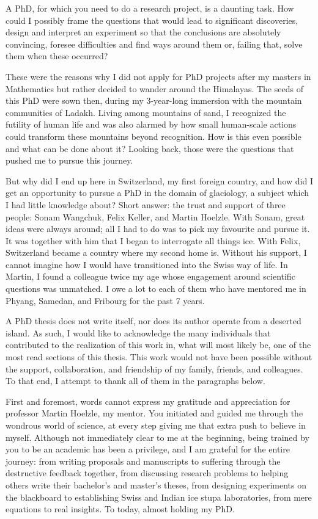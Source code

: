 \label{sec:acknowledgement}

A PhD, for which you need to do a research project, is a daunting task. How could I possibly frame the questions
that would lead to significant discoveries, design and interpret an experiment so that the conclusions are
absolutely convincing, foresee difficulties and find ways around them or, failing that, solve them when these
occurred?

These were the reasons why I did not apply for PhD projects after my masters in Mathematics but rather decided
to wander around the Himalayas. The seeds of this PhD were sown then, during my 3-year-long immersion with the
mountain communities of Ladakh. Living among mountains of sand, I recognized the futility of human life and was
also alarmed by how small human-scale actions could transform these mountains beyond recognition. How is this
even possible and what can be done about it? Looking back, those were the questions that pushed me to pursue
this journey. 

But why did I end up here in Switzerland, my first foreign country, and how did I get an opportunity to pursue a
PhD in the domain of glaciology, a subject which I had little knowledge about? Short answer: the trust and support
of three people: Sonam Wangchuk, Felix Keller, and Martin Hoelzle. With Sonam, great ideas were always 
around; all I had to do was to pick my favourite and pursue it. It was together with him that I began to interrogate
all things ice.  With Felix, Switzerland became a country where my second home is. Without his support, I cannot
imagine how I would have transitioned into the Swiss way of life. In Martin, I found a colleague twice my age
whose engagement around scientific questions was unmatched. I owe a lot to each of them who have mentored me
in Phyang, Samedan, and Fribourg for the past 7 years.

A PhD thesis does not write itself, nor does its author operate from a deserted island. As such, I would like to
acknowledge the many individuals that contributed to the realization of this work in, what will most likely be,
one of the most read sections of this thesis. This work would not have been possible without the support,
collaboration, and friendship of my family, friends, and colleagues. To that end, I attempt to thank all of them
in the paragraphs below.

First and foremost, words cannot express my gratitude and appreciation for professor Martin Hoelzle, my mentor.
You initiated and guided me through the wondrous world of science, at every step giving me that extra push to
believe in myself. Although not immediately clear to me at the beginning, being trained by you to be an academic
has been a privilege, and I am grateful for the entire journey: from writing proposals and manuscripts to
suffering through the destructive feedback together, from discussing research problems to helping others write
their bachelor's and master's theses, from designing experiments on the blackboard to establishing
Swiss and Indian ice stupa laboratories, from mere equations to real insights. To today, almost holding my PhD.


